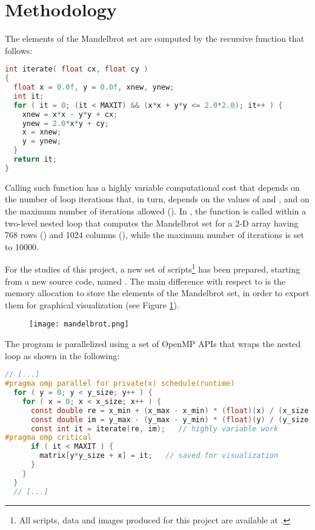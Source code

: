 \section{Methodology}\label{sec:method}
The elements of the Mandelbrot set are computed by the recursive function  that follows:

\begin{lstlisting}[language=C]
int iterate( float cx, float cy )
{
  float x = 0.0f, y = 0.0f, xnew, ynew;
  int it;
  for ( it = 0; (it < MAXIT) && (x*x + y*y <= 2.0*2.0); it++ ) {
    xnew = x*x - y*y + cx;
    ynew = 2.0*x*y + cy;
    x = xnew;
    y = ynew;
  }
  return it;
}
\end{lstlisting}

\noindent
Calling such function has a highly variable computational cost that depends on the number of loop iterations that, in turn, depends on the values of  and , and on the maximum number of iterations allowed (). In , the  function is called within a two-level nested loop that computes the Mandelbrot set for a 2-D array having 768 rows () and 1024 columns (), while the maximum number of iterations is set to 10000.

For the studies of this project, a new set of scripts\footnote{All scripts, data and images produced for this project are available at \href{https://github.com/mbarbetti/ppf-omp-project}{}.} has been prepared, starting from a new source code, named . The main difference with respect to  is the memory allocation to store the elements of the Mandelbrot set, in order to export them for graphical visualization (see Figure \ref{fig:mandelbrot}). 

\begin{figure}[b!]
    \centering
    \texttt{[image: mandelbrot.png]}
    \caption{\label{fig:mandelbrot}}
\end{figure}

The program is parallelized using a set of OpenMP APIs that wraps the nested loop as shown in the following:

\newpage

\begin{lstlisting}[language=C]
  // [...]
#pragma omp parallel for private(x) schedule(runtime)
  for ( y = 0; y < y_size; y++ ) {
    for ( x = 0; x < x_size; x++ ) {
      const double re = x_min + (x_max - x_min) * (float)(x) / (x_size - 1);
      const double im = y_max - (y_max - y_min) * (float)(y) / (y_size - 1);
      const int it = iterate(re, im);   // highly variable work
#pragma omp critical
	  if ( it < MAXIT ) {
	    matrix[y*y_size + x] = it;   // saved for visualization
      }
    }
  }
  // [...]
\end{lstlisting}

